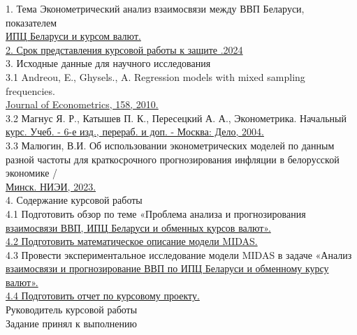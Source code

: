 \documentclass[a4paper, 12pt]{extarticle}
\numberwithin{equation}{subsection}
\begin{document}
	1. Тема \hspace{5mm} Эконометрический анализ взаимосвязи между ВВП Беларуси, показателем \\
	\hspace*{22mm}\underline{ИПЦ Беларуси и курсом валют.\hspace*{\linegoal}}\\[2mm]
	\underline{2. Срок представления курсовой работы к защите  \quad {}.2024 \hspace*{\linegoal}}\\[2mm]
	3. Исходные данные для научного исследования\\[2mm]
	3.1 Andreou, E., Ghysels., A. Regression models with mixed sampling frequencies.\\
	\underline{Journal of Econometrics, 158, 2010.\hspace*{\linegoal}}\\[2mm]
	3.2 Магнус Я. Р., Катышев П. К., Пересецкий А. А., Эконометрика. Начальный \\
	\underline{курс. Учеб. - 6-е изд., перераб. и доп. - Москва: Дело, 2004.\hspace*{\linegoal}} \\[2mm]
	3.3 Малюгин, В.И. Об использовании эконометрических моделей по данным разной частоты для краткосрочного прогнозирования инфляции в белорусской экономике / \\
	\underline{Минск. НИЭИ, 2023.\hspace*{\linegoal}}\\[2mm]
	4. Содержание курсовой работы\\[2mm]
	4.1 Подготовить обзор по теме «Проблема анализа и прогнозирования \\
	\underline{взаимосвязи ВВП, ИПЦ Беларуси и обменных курсов валют».\hspace*{\linegoal}}\\[2mm]
	\underline{4.2 Подготовить математическое описание модели MIDAS.\hspace*{\linegoal}}\\[2mm]
	4.3 Провести экспериментальное исследование модели MIDAS в задаче «Анализ \\
	\underline{взаимосвязи и прогнозирование ВВП по ИПЦ Беларуси и обменному курсу валют».\hspace*{\linegoal}}\\[2mm]
	\underline{4.4 Подготовить отчет по курсовому проекту.\hspace*{\linegoal}}\\[2mm]
	\vfill
	\noindent Руководитель курсовой работы \\[2mm]
	Задание принял к выполнению \hspace*{4mm} \\[2mm]
	\newpage
	\tableofcontents
	\newpage
\end{document}
